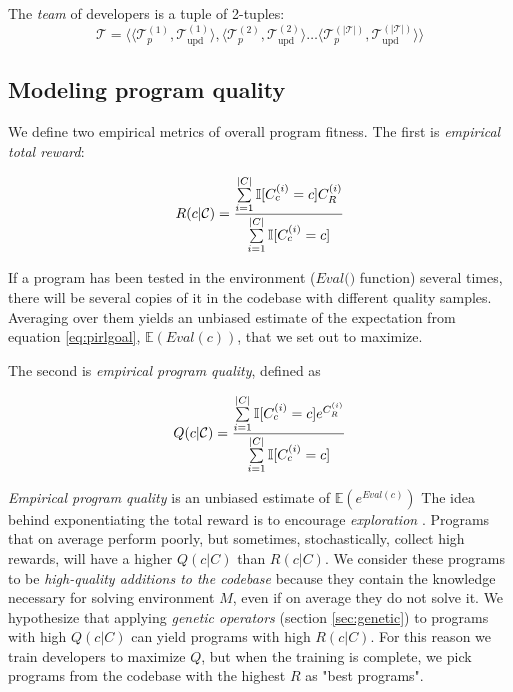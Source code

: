 The \emph{team} of developers is a tuple of 2-tuples:
\begin{equation}
    \mathcal{T} = \langle \langle \mathcal{T}_p^{(1)}, \mathcal{T}_\text{upd}^{(1)} \rangle, \langle \mathcal{T}_p^{(2)}, \mathcal{T}_\text{upd}^{(2)} \rangle \dots \langle \mathcal{T}_p^{(|\mathcal{T}|)}, \mathcal{T}_\text{upd}^{(|\mathcal{T}|)} \rangle \rangle
\end{equation}

\newpage \subsection{Modeling program quality}
\label{sec:quality}

We define two empirical metrics of overall program fitness.
The first is \emph{empirical total reward}:

\begin{equation}
    R(c|\mathcal{C}) = \frac{\sum\limits_{i=1}^{|C|} \mathbb{I}[C_c^{(i)}=c] C_R^{(i)}}{\sum\limits_{i=1}^{|C|} \mathbb{I}[C_c^{(i)}=c]}
\end{equation}

If a program has been tested in the environment ($\textit{Eval()}$ function) several times, there will be several copies of it in the codebase with different quality samples.
Averaging over them yields an unbiased estimate of the expectation from equation \ref{eq:pirlgoal}, $\mathbb{E}(\mathit{Eval}(c))$, that we set out to maximize.

The second is \emph{empirical program quality}, defined as

\begin{equation}
    Q(c|\mathcal{C}) = \frac{\sum\limits_{i=1}^{|C|} \mathbb{I}[C_c^{(i)}=c] e^{C_R^{(i)}}}{\sum\limits_{i=1}^{|C|} \mathbb{I}[C_c^{(i)}=c]}
    \label{eq:empquality}
\end{equation}

\emph{Empirical program quality} is an unbiased estimate of $\mathbb{E}(e^{\mathit{Eval}(c)})$
The idea behind exponentiating the total reward is to encourage \emph{exploration} \cite{exploration}.
Programs that on average perform poorly, but sometimes, stochastically, collect high rewards, will have a higher $Q(c|C)$ than $R(c|C)$.
We consider these programs to be \emph{high-quality additions to the codebase} because they contain the knowledge necessary for solving environment $M$, even if on average they do not solve it.
We hypothesize that applying \emph{genetic operators} (section \ref{sec:genetic}) to programs with high $Q(c|C)$ can yield programs with high $R(c|C)$.
For this reason we train developers to maximize $Q$, but when the training is complete, we pick programs from the codebase with the highest $R$ as "best programs".
 
